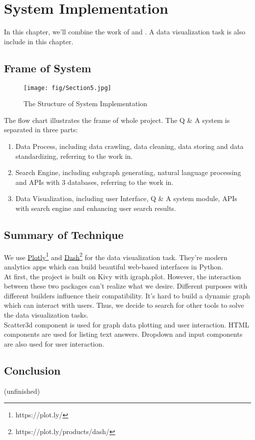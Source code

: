 \chapter{System Implementation}
\label{Ch-5:Sec:System}

In this chapter, we'll combine the work of  and . A data visualization task is also include in this chapter. 

\section{Frame of System}

\begin{figure}
	\centering
	\texttt{[image: fig/Section5.jpg]}
	\caption{The Structure of System Implementation}
	\label{fig:section5-pic1}
\end{figure}

The flow chart  illustrates the frame of whole project. The Q \& A system is separated in three parts:
\begin{enumerate}
	\item Data Process, including data crawling, data cleaning, data storing and data standardizing, referring to the work in.
	\item Search Engine, including subgraph generating, natural language processing and APIs with 3 databases, referring to the work in.
	\item Data Visualization, including user Interface, Q \& A system module, APIs with search engine and enhancing user search results.
\end{enumerate}

\section{Summary of Technique}

We use \href{https://plot.ly/}{Plotly}\footnote{https://plot.ly/} and \href{https://plot.ly/products/dash/}{Dash}\footnote{https://plot.ly/products/dash/} for the data visualization task. They're modern analytics apps which can build beautiful web-based interfaces in Python. \\
At first, the project is built on Kivy with igraph.plot. However, the interaction between these two packages can't realize what we desire. Different purposes with different builders influence their compatibility. It's hard to build a dynamic graph which can interact with users. Thus, we decide to search for other tools to solve the data visualization tasks.\\
Scatter3d component is used for graph data plotting and user interaction. HTML components are used for listing text answers. Dropdown and input components are also used for user interaction.

\section{Conclusion}
(unfinished)